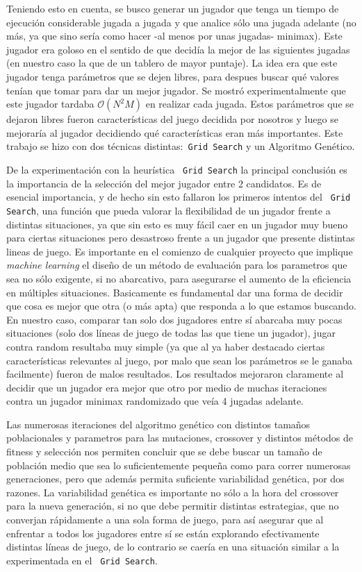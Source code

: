 \documentclass[A4paper,oneside,fleqn,11pt]{article}
\theoremstyle{definition}
\begin{document}
Teniendo esto en cuenta, se busco generar un jugador que tenga un tiempo de ejecución considerable jugada a jugada y que analice sólo una jugada adelante (no más, ya que sino sería como hacer -al menos por unas jugadas- minimax). Este jugador era goloso en el sentido de que decidía la mejor de las siguientes jugadas (en nuestro caso la que de un tablero de mayor puntaje). La idea era que este jugador tenga parámetros que se dejen libres, para despues buscar qué valores tenían que tomar para dar un mejor jugador. Se mostró experimentalmente que este jugador tardaba $\mathcal{O}(N^2M)$ en realizar cada jugada. Estos parámetros que se dejaron libres fueron características del juego decidida por nosotros y luego se mejoraría al jugador decidiendo qué características eran más importantes. Este trabajo se hizo con dos técnicas distintas:\texttt{ Grid Search} y un Algoritmo Genético.

De la experimentación con la heurística \texttt{ Grid Search} la principal conclusión es la importancia de la selección del mejor jugador entre 2 candidatos. Es de esencial importancia, y de hecho sin esto fallaron los primeros intentos del \texttt{ Grid Search}, una función que pueda valorar la flexibilidad de un jugador frente a distintas situaciones, ya que sin esto es muy fácil caer en un jugador muy bueno para ciertas situaciones pero desastroso frente a un jugador que presente distintas lineas de juego. Es importante en el comienzo de cualquier proyecto que implique \textit{machine learning} el diseño de un método de evaluación para los parametros que sea no sólo exigente, si no abarcativo, para asegurarse el aumento de la eficiencia en múltiples situaciones. Basicamente es fundamental dar una forma de decidir que cosa es mejor que otra (o más apta) que responda a lo que estamos buscando. En nuestro caso, comparar tan solo dos jugadores entre sí abarcaba muy pocas situaciones (solo dos líneas de juego de todas las que tiene un jugador), jugar contra random resultaba muy simple (ya que al ya haber destacado ciertas características relevantes al juego, por malo que sean los parámetros se le ganaba facilmente) fueron de malos resultados. Los resultados mejoraron claramente al decidir que un jugador era mejor que otro por medio de muchas iteraciones contra un jugador minimax randomizado que veía 4 jugadas adelante.

Las numerosas iteraciones del algoritmo genético con distintos tamaños poblacionales y parametros para las mutaciones, crossover y distintos métodos de fitness y selección nos permiten concluir que se debe buscar un tamaño de población medio que sea lo suficientemente pequeña como para correr numerosas generaciones, pero que además permita suficiente variabilidad genética, por dos razones. La variabilidad genética es importante no sólo a la hora del crossover para la nueva generación, si no que debe permitir distintas estrategias, que no converjan rápidamente a una sola forma de juego, para así asegurar que al enfrentar a todos los jugadores entre sí se están explorando efectivamente distintas líneas de juego, de lo contrario se caería en una situación similar a la experimentada en el \texttt{ Grid Search}.
\end{document}
